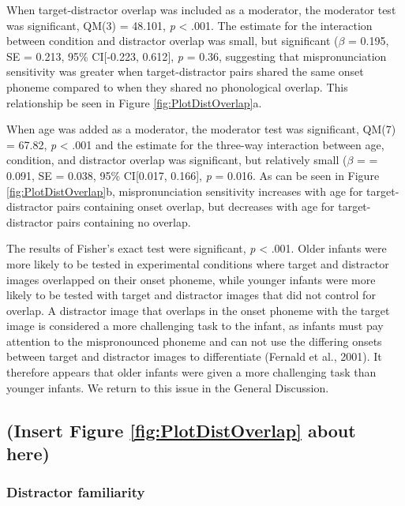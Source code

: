\documentclass[man]{apa6}
\begin{document}
When target-distractor overlap was included as a moderator, the moderator test was significant, QM(3) = 48.101, \emph{p} \textless{} .001. The estimate for the interaction between condition and distractor overlap was small, but significant (\(\beta\) = 0.195, SE = 0.213, 95\% CI{[}-0.223, 0.612{]}, \emph{p} = 0.36, suggesting that mispronunciation sensitivity was greater when target-distractor pairs shared the same onset phoneme compared to when they shared no phonological overlap. This relationship be seen in Figure \ref{fig:PlotDistOverlap}a.

When age was added as a moderator, the moderator test was significant, QM(7) = 67.82, \emph{p} \textless{} .001 and the estimate for the three-way interaction between age, condition, and distractor overlap was significant, but relatively small (\(\beta\) = = 0.091, SE = 0.038, 95\% CI{[}0.017, 0.166{]}, \emph{p} = 0.016. As can be seen in Figure \ref{fig:PlotDistOverlap}b, mispronunciation sensitivity increases with age for target-distractor pairs containing onset overlap, but decreases with age for target-distractor pairs containing no overlap.

The results of Fisher's exact test were significant, \emph{p} \textless{} .001. Older infants were more likely to be tested in experimental conditions where target and distractor images overlapped on their onset phoneme, while younger infants were more likely to be tested with target and distractor images that did not control for overlap. A distractor image that overlaps in the onset phoneme with the target image is considered a more challenging task to the infant, as infants must pay attention to the mispronounced phoneme and can not use the differing onsets between target and distractor images to differentiate (Fernald et al., 2001). It therefore appears that older infants were given a more challenging task than younger infants. We return to this issue in the General Discussion.

\hypertarget{insert-figure-reffigplotdistoverlap-about-here}{%
\subsection{(Insert Figure \ref{fig:PlotDistOverlap} about here)}\label{insert-figure-reffigplotdistoverlap-about-here}}

\hypertarget{distractor-familiarity}{%
\subsubsection{Distractor familiarity}\label{distractor-familiarity}}
\end{document}
